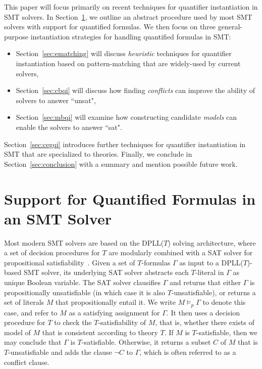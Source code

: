 \documentclass[oribibl]{llncs}
\begin{document}
This paper will focus primarily on recent techniques for quantifier instantiation in SMT solvers.
In Section~\ref{sec:quant}, we outline an abstract procedure used by most SMT solvers with support for quantified formulas.
We then focus on three general-purpose instantiation strategies for handling quantified formulas in SMT:
\begin{itemize}
\item Section~\ref{sec:ematching} will discuss \emph{heuristic} techniques for quantifier instantiation based on pattern-matching that
are widely-used by current solvers,
\item Section~\ref{sec:cbqi} will discuss how finding \emph{conflicts} can improve the ability of solvers to answer ``unsat",
\item Section~\ref{sec:mbqi} will examine how constructing candidate \emph{models} can enable the solvers to answer ``sat".
\end{itemize} 
Section~\ref{sec:cegqi} introduces further techniques for quantifier instantiation in SMT that 
are specialized to theories.
Finally, we conclude in Section~\ref{sec:conclusion} with a summary and mention possible future work.

\section{Support for Quantified Formulas in an SMT Solver}
\label{sec:quant}

Most modern SMT solvers are based on the DPLL($T$) solving architecture,
where a set of decision procedures for $T$ are modularly combined with a SAT solver for propositional satisfiability~\cite{}.
Given a set of $T$-formulas $\Gamma$ as input to a DPLL($T$)-based SMT solver, its underlying SAT solver
abstracts each $T$-literal in $\Gamma$ as unique Boolean variable.
The SAT solver clausifies $\Gamma$ and returns that 
either $\Gamma$ is propositionally unsatisfiable (in which case it is also $T$-unsatisfiable),
or returns a set of literals $M$ that propositionally entail it.
We write $M \models_p \Gamma$ to denote this case, and refer to $M$ as a satisfying assignment for $\Gamma$.
It then uses a decision procedure for $T$ to
check the $T$-satisfiability of $M$, that is, whether there exists of model of $M$ that is consistent according to theory $T$.
If $M$ is $T$-satisfiable, then we may conclude that $\Gamma$ is $T$-satisfiable.
Otherwise, it returns a subset $C$ of $M$ that is $T$-unsatisfiable and adds the clause $\neg C$ to $\Gamma$,
which is often referred to as a conflict clause.
\end{document}
